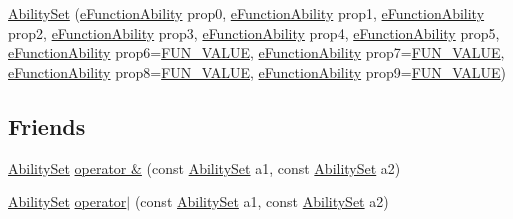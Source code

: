 \begin{DoxyCompactItemize}
\hyperlink{classocra_1_1AbilitySet_a1383bb4705a010d46ccab36107a20985}{Ability\+Set} (\hyperlink{namespaceocra_a40ddbec106a6034cd2047bba9945b568}{e\+Function\+Ability} prop0, \hyperlink{namespaceocra_a40ddbec106a6034cd2047bba9945b568}{e\+Function\+Ability} prop1, \hyperlink{namespaceocra_a40ddbec106a6034cd2047bba9945b568}{e\+Function\+Ability} prop2, \hyperlink{namespaceocra_a40ddbec106a6034cd2047bba9945b568}{e\+Function\+Ability} prop3, \hyperlink{namespaceocra_a40ddbec106a6034cd2047bba9945b568}{e\+Function\+Ability} prop4, \hyperlink{namespaceocra_a40ddbec106a6034cd2047bba9945b568}{e\+Function\+Ability} prop5, \hyperlink{namespaceocra_a40ddbec106a6034cd2047bba9945b568}{e\+Function\+Ability} prop6=\hyperlink{namespaceocra_a40ddbec106a6034cd2047bba9945b568acfb47b20329993093d2022b017239bd8}{F\+U\+N\+\_\+\+V\+A\+L\+UE}, \hyperlink{namespaceocra_a40ddbec106a6034cd2047bba9945b568}{e\+Function\+Ability} prop7=\hyperlink{namespaceocra_a40ddbec106a6034cd2047bba9945b568acfb47b20329993093d2022b017239bd8}{F\+U\+N\+\_\+\+V\+A\+L\+UE}, \hyperlink{namespaceocra_a40ddbec106a6034cd2047bba9945b568}{e\+Function\+Ability} prop8=\hyperlink{namespaceocra_a40ddbec106a6034cd2047bba9945b568acfb47b20329993093d2022b017239bd8}{F\+U\+N\+\_\+\+V\+A\+L\+UE}, \hyperlink{namespaceocra_a40ddbec106a6034cd2047bba9945b568}{e\+Function\+Ability} prop9=\hyperlink{namespaceocra_a40ddbec106a6034cd2047bba9945b568acfb47b20329993093d2022b017239bd8}{F\+U\+N\+\_\+\+V\+A\+L\+UE})
\end{DoxyCompactItemize}

\subsection*{Friends}
{\bf }\par
\begin{DoxyCompactItemize}
\item 
\hyperlink{classocra_1_1AbilitySet}{Ability\+Set} \hyperlink{classocra_1_1AbilitySet_a186c9af3e53f43c03761eae7457a5502}{operator \&} (const \hyperlink{classocra_1_1AbilitySet}{Ability\+Set} a1, const \hyperlink{classocra_1_1AbilitySet}{Ability\+Set} a2)
\item 
\hyperlink{classocra_1_1AbilitySet}{Ability\+Set} \hyperlink{classocra_1_1AbilitySet_a31839dcdc5a95a8f78f786f2488618a6}{operator$\vert$} (const \hyperlink{classocra_1_1AbilitySet}{Ability\+Set} a1, const \hyperlink{classocra_1_1AbilitySet}{Ability\+Set} a2)
\end{DoxyCompactItemize}



